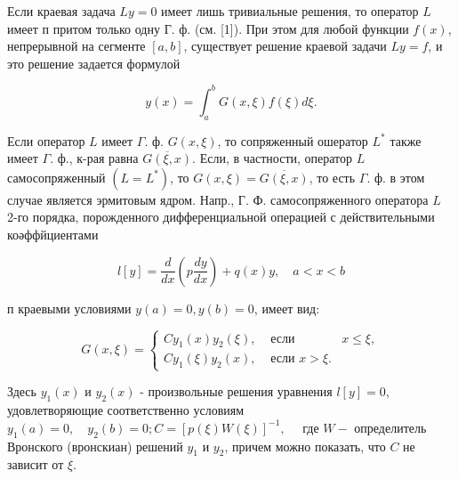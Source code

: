 \documentclass[10pt]{article}
\begin{document}
Если краевая задача $L y=0$ имеет лишь тривиальные решения, то оператор $L$ имеет п притом только одну Г. ф. (см. [1]). При этом для любой функции $f(x)$, непрерывной на сегменте $[a, b]$, существует решение краевой задачи $L y=f$, и это решение задается формулой



\[

y(x)=\int_{a}^{b} G(x, \xi) f(\xi) d \xi .

\]



Если оператор $L$ имеет $\Gamma$. ф. $G(x, \xi)$, то сопряженный ошератор $L^{*}$ также имеет $\Gamma$. ф., к-рая равна $\overline{G(\xi, x)}$. Если, в частности, оператор $L$ самосопряженный $\left(L=L^{*}\right)$, то $G(x, \xi)=\overline{G(\xi, x)}$, то есть $\Gamma$. ф. в этом случае является эрмитовым ядром. Напр., Г. Ф. самосопряженного оператора $L$ 2-го порядка, порожденного дифференциальной операцией с действительными коәффйциентами



\[

l[y]=\frac{d}{d x}\left(p \frac{d y}{d x}\right)+q(x) y, \quad a<x<b

\]



п краевыми условиями $y(a)=0, y(b)=0$, имеет вид:



\[

G(x, \xi)=\left\{\begin{array}{lll}

C y_{1}(x) y_{2}(\xi), & \text { если } & x \leqslant \xi, \\

C y_{1}(\xi) y_{2}(x), & \text { если } x>\xi .

\end{array}\right.

\]



Здесь $y_{1}(x)$ и $y_{2}(x)$ - произвольные решения уравнения $l[y]=0$, удовлетворяющие соответственно условиям $y_{1}(a)=0, \quad y_{2}(b)=0 ; C=[p(\xi) W(\xi)]^{-1}, \quad$ где $W-$ определитель Вронского (вронскиан) решений $y_{1}$ и $y_{2}$, причем можно показать, что $C$ не зависит от $\xi$.
\end{document}
